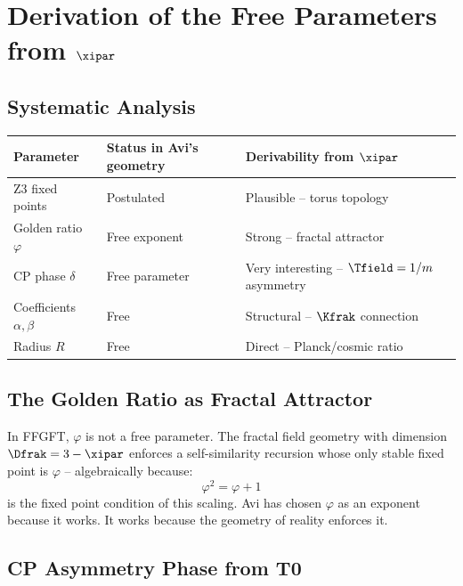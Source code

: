 \section{\texorpdfstring{Derivation of the Free Parameters from $\xipar$}{Derivation of the Free Parameters from}}

\subsection{Systematic Analysis}

\begin{center}
{\footnotesize
\begin{tabularx}{\textwidth}{lXX}
\toprule
Parameter & Status in Avi's geometry & Derivability from $\xipar$ \\
\midrule
Z3 fixed points & Postulated & Plausible -- torus topology \\
Golden ratio $\varphi$ & Free exponent & Strong -- fractal attractor \\
CP phase $\delta$ & Free parameter & Very interesting -- $\Tfield = 1/m$ asymmetry \\
Coefficients $\alpha, \beta$ & Free & Structural -- $\Kfrak$ connection \\
Radius $R$ & Free & Direct -- Planck/cosmic ratio \\
\bottomrule
\end{tabularx}
} %
\end{center}

\subsection{The Golden Ratio as Fractal Attractor}

In FFGFT, $\varphi$ is not a free parameter. The fractal field geometry with dimension $\Dfrak = 3 - \xipar$ enforces a self-similarity recursion whose only stable fixed point is $\varphi$ -- algebraically because:
\begin{equation}
  \varphi^2 = \varphi + 1
\end{equation}
is the fixed point condition of this scaling. Avi has chosen $\varphi$ as an exponent because it works. It works because the geometry of reality enforces it.

\subsection{CP Asymmetry Phase from T0}

